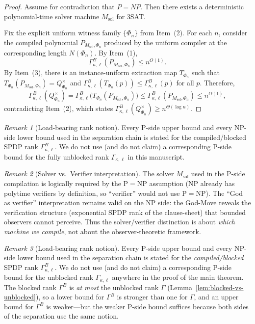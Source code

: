 \documentclass[12pt]{article}
\theoremstyle{definition}
\theoremstyle{definition}
\theoremstyle{remark}
\newtheorem{remark}{Remark}
\theoremstyle{remark}
\begin{document}
\begin{proof}
Assume for contradiction that $P=NP$. Then there exists a deterministic polynomial-time
solver machine $M_{\mathrm{sol}}$ for $3$SAT.

Fix the explicit uniform witness family $\{\Phi_n\}$ from Item~(2). For each $n$, consider the
compiled polynomial $P_{M_{\mathrm{sol}},\Phi_n}$ produced by the uniform compiler at the
corresponding length $N(\Phi_n)$. By Item~(1),
\[
\Gamma^{B}_{\kappa,\ell}(P_{M_{\mathrm{sol}},\Phi_n}) \le n^{O(1)}.
\]
By Item~(3), there is an instance-uniform extraction map $T_{\Phi_n}$ such that
$T_{\Phi_n}(P_{M_{\mathrm{sol}},\Phi_n}) = Q^{\times}_{\Phi_n}$ and
$\Gamma^{B}_{\kappa,\ell}(T_{\Phi_n}(p)) \le \Gamma^{B}_{\kappa,\ell}(p)$ for all $p$.
Therefore,
\[
\Gamma^{B}_{\kappa,\ell}(Q^{\times}_{\Phi_n})
=
\Gamma^{B}_{\kappa,\ell}\!\Big(T_{\Phi_n}(P_{M_{\mathrm{sol}},\Phi_n})\Big)
\le
\Gamma^{B}_{\kappa,\ell}(P_{M_{\mathrm{sol}},\Phi_n})
\le n^{O(1)},
\]
contradicting Item~(2), which states
$\Gamma^{B}_{\kappa,\ell}(Q^{\times}_{\Phi_n}) \ge n^{\Theta(\log n)}$.
\end{proof}

\begin{remark}[Load-bearing rank notion]
Every P-side upper bound and every NP-side lower bound used in the separation chain is stated
for the compiled/blocked SPDP rank $\Gamma^{B}_{\kappa,\ell}$.
We do not use (and do not claim) a corresponding P-side bound for the fully unblocked rank
$\Gamma_{\kappa,\ell}$ in this manuscript.
\end{remark}

\begin{remark}[Solver vs.\ Verifier interpretation]
\label{rem:solver-vs-verifier}
The solver $M_{\mathrm{sol}}$ used in the P-side compilation is logically
required by the P$=$NP assumption (NP already has polytime verifiers by definition,
so ``verifier'' would not use P$=$NP). The ``God as verifier'' interpretation
remains valid on the NP side: the God-Move reveals the verification structure
(exponential SPDP rank of the clause-sheet) that bounded observers cannot perceive.
Thus the solver/verifier distinction is about \emph{which machine we compile},
not about the observer-theoretic framework.
\end{remark}

\begin{remark}[Load-bearing rank notion]
\label{rem:loadbearing-rank}
Every P-side upper bound and every NP-side lower bound used in the separation chain
is stated for the \emph{compiled/blocked} SPDP rank $\Gamma^{B}_{\kappa,\ell}$.
We do not use (and do not claim) a corresponding P-side bound for the unblocked rank
$\Gamma_{\kappa,\ell}$ anywhere in the proof of the main theorem.
The blocked rank $\Gamma^B$ is \emph{at most} the unblocked rank $\Gamma$
(Lemma~\ref{lem:blocked-vs-unblocked}), so a lower bound for $\Gamma^B$ is stronger
than one for $\Gamma$, and an upper bound for $\Gamma^B$ is weaker---but the weaker
P-side bound suffices because both sides of the separation use the same notion.
\end{remark}
\end{document}
